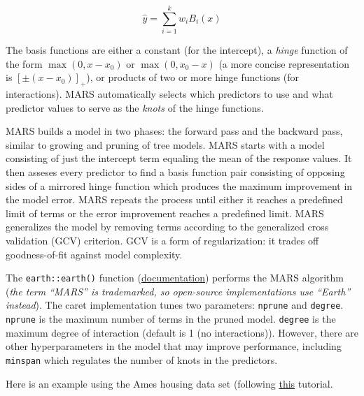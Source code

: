 \documentclass[
]{book}
\begin{document}
\[\hat{y} = \sum_{i=1}^{k}{w_iB_i(x)}\]

The basis functions are either a constant (for the intercept), a \emph{hinge} function of the form \(\max(0, x - x_0)\) or \(\max(0, x_0 - x)\) (a more concise representation is \([\pm(x - x_0)]_+\)), or products of two or more hinge functions (for interactions). MARS automatically selects which predictors to use and what predictor values to serve as the \emph{knots} of the hinge functions.

MARS builds a model in two phases: the forward pass and the backward pass, similar to growing and pruning of tree models. MARS starts with a model consisting of just the intercept term equaling the mean of the response values. It then asseses every predictor to find a basis function pair consisting of opposing sides of a mirrored hinge function which produces the maximum improvement in the model error. MARS repeats the process until either it reaches a predefined limit of terms or the error improvement reaches a predefined limit. MARS generalizes the model by removing terms according to the generalized cross validation (GCV) criterion. GCV is a form of regularization: it trades off goodness-of-fit against model complexity.

The \texttt{earth::earth()} function (\href{https://www.rdocumentation.org/packages/earth/versions/5.1.2/topics/earth}{documentation}) performs the MARS algorithm (\emph{the term ``MARS'' is trademarked, so open-source implementations use ``Earth'' instead}). The caret implementation tunes two parameters: \texttt{nprune} and \texttt{degree}. \texttt{nprune} is the maximum number of terms in the pruned model. \texttt{degree} is the maximum degree of interaction (default is 1 (no interactions)). However, there are other hyperparameters in the model that may improve performance, including \texttt{minspan} which regulates the number of knots in the predictors.

Here is an example using the Ames housing data set (following \href{http://uc-r.github.io/mars}{this} tutorial.
\end{document}
